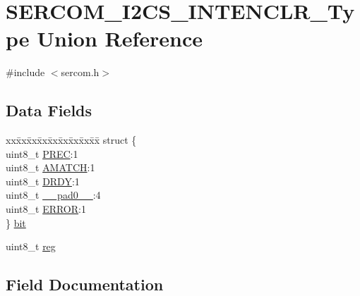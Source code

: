 \hypertarget{union_s_e_r_c_o_m___i2_c_s___i_n_t_e_n_c_l_r___type}{}\section{S\+E\+R\+C\+O\+M\+\_\+\+I2\+C\+S\+\_\+\+I\+N\+T\+E\+N\+C\+L\+R\+\_\+\+Type Union Reference}
\label{union_s_e_r_c_o_m___i2_c_s___i_n_t_e_n_c_l_r___type}


{\ttfamily \#include $<$sercom.\+h$>$}

\subsection*{Data Fields}
\begin{DoxyCompactItemize}
\item 
\begin{tabbing}
xx\=xx\=xx\=xx\=xx\=xx\=xx\=xx\=xx\=\kill
struct \{\\
\>uint8\_t \mbox{\hyperlink{union_s_e_r_c_o_m___i2_c_s___i_n_t_e_n_c_l_r___type_a0a58b5fb217cc2964590994ae435b2f4}{PREC}}:1\\
\>uint8\_t \mbox{\hyperlink{union_s_e_r_c_o_m___i2_c_s___i_n_t_e_n_c_l_r___type_ab699ad93435d97fc3aedd27daf8f3d20}{AMATCH}}:1\\
\>uint8\_t \mbox{\hyperlink{union_s_e_r_c_o_m___i2_c_s___i_n_t_e_n_c_l_r___type_a37b5281f35b36c2887d5fc0d5dc9a444}{DRDY}}:1\\
\>uint8\_t \mbox{\hyperlink{union_s_e_r_c_o_m___i2_c_s___i_n_t_e_n_c_l_r___type_a8b4eebe79ded0459acec2f4950102ba3}{\_\_pad0\_\_}}:4\\
\>uint8\_t \mbox{\hyperlink{union_s_e_r_c_o_m___i2_c_s___i_n_t_e_n_c_l_r___type_a4be51829c8720b7d159b77c39924afaa}{ERROR}}:1\\
\} \mbox{\hyperlink{union_s_e_r_c_o_m___i2_c_s___i_n_t_e_n_c_l_r___type_a8d3e92e3fac7b5dd1dc5ab2506040a51}{bit}}\\

\end{tabbing}\item 
uint8\+\_\+t \mbox{\hyperlink{union_s_e_r_c_o_m___i2_c_s___i_n_t_e_n_c_l_r___type_a9428adc9af4653a2050e2536b55dec8d}{reg}}
\end{DoxyCompactItemize}


\subsection{Field Documentation}
\mbox{\label{union_s_e_r_c_o_m___i2_c_s___i_n_t_e_n_c_l_r___type_a8b4eebe79ded0459acec2f4950102ba3}} 
